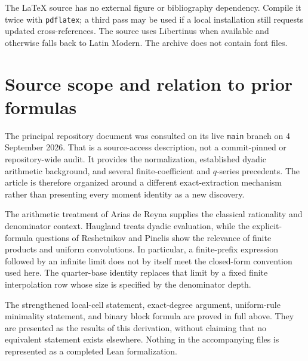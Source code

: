 \documentclass[11pt,a4paper]{article}
\numberwithin{equation}{section}
\theoremstyle{definition}
\theoremstyle{remark}
\begin{document}
The LaTeX source has no external figure or bibliography dependency. Compile it twice with \texttt{pdflatex}; a third pass may be used if a local installation still requests updated cross-references. The source uses Libertinus when available and otherwise falls back to Latin Modern. The archive does not contain font files.

\section{Source scope and relation to prior formulas}
\label{app:sources}

The principal repository document was consulted on its live \texttt{main} branch on 4 September 2026. That is a source-access description, not a commit-pinned or repository-wide audit. It provides the normalization, established dyadic arithmetic background, and several finite-coefficient and $q$-series precedents. The article is therefore organized around a different exact-extraction mechanism rather than presenting every moment identity as a new discovery.

The arithmetic treatment of Arias de Reyna supplies the classical rationality and denominator context. Haugland treats dyadic evaluation, while the explicit-formula questions of Reshetnikov and Pinelis show the relevance of finite products and uniform convolutions. In particular, a finite-prefix expression followed by an infinite limit does not by itself meet the closed-form convention used here. The quarter-base identity replaces that limit by a fixed finite interpolation row whose size is specified by the denominator depth.

The strengthened local-cell statement, exact-degree argument, uniform-rule minimality statement, and binary block formula are proved in full above. They are presented as the results of this derivation, without claiming that no equivalent statement exists elsewhere. Nothing in the accompanying files is represented as a completed Lean formalization.
\end{document}
